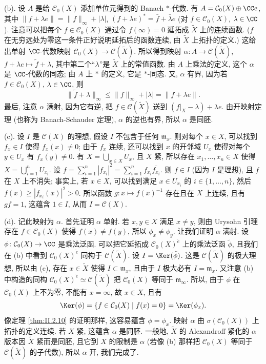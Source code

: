 \begin{exercise}[$\mathcal{C}(X)$ 的谱]
\begin{solution}
(b). 设 $A$ 是给 $\mathcal{C}_0(X)$ 添加单位元得到的 Banach $*$-代数. 有 $A = \mathcal{C}_0(X) \oplus \CC e$, 其中 $\|f + \lambda e\| = \|f\|_{\infty} + |\lambda|$, $(f + \lambda e)^* = \bar{f} + \bar{\lambda}e$ (对 $f \in \mathcal{C}_0(X)$, $\lambda \in \CC$).
注意可以把每个 $f \in \mathcal{C}_0(X)$ 通过令 $f(\infty) = 0$ 延拓成 $\tilde{X}$ 上的连续函数. ($f$ 在无穷远处为零这一条件正好说明延拓后的函数连续, 由 $\tilde{X}$ 上拓扑的定义.) 这给出单射 $\CC$-代数映射 $\mathcal{C}_0(X) \to \mathcal{C}(\tilde{X})$. 所以得到映射 $\alpha \colon A \to \mathcal{C}(\tilde{X})$, $f + \lambda e \longmapsto \tilde{f} + \lambda$, 其中第二个``$\lambda$''是 $\tilde{X}$ 上的常值函数. 由 $A$ 上乘法的定义, 这个 $\alpha$ 是 $\CC$-代数的同态; 由 $A$ 上 $*$ 的定义, 它是 $*$-同态. 又, $\alpha$ 有界, 因为若 $f \in \mathcal{C}_0(X)$, $\lambda \in \CC$, 则
\[
\|\tilde{f} + \lambda\|_{\infty} \leq \|f\|_{\infty} + |\lambda| = \|f + \lambda e\|.
\]
最后, 注意 $\alpha$ 满射, 因为它有逆, 把 $f \in \mathcal{C}(\tilde{X})$ 送到 $(f|_X - \lambda) + \lambda e$. 由开映射定理 (也称为 Banach-Schauder 定理), $\alpha$ 的逆也有界, 所以 $\alpha$ 是同胚.

(c). 设 $I$ 是 $\mathcal{C}(X)$ 的理想, 假设 $I$ 不包含于任何 $\mathfrak{m}_x$. 则对每个 $x \in X$, 可以找到 $f_x \in I$ 使得 $f_x(x) \neq 0$; 由于 $f_x$ 连续, 还可以找到 $x$ 的开邻域 $U_x$ 使得对每个 $y \in U_x$ 有 $f_x(y) \neq 0$. 有 $X = \bigcup_{x \in X}U_x$, 且 $X$ 紧, 所以存在 $x_1, \ldots, x_n \in X$ 使得 $X = \bigcup_{i=1}^n U_{x_i}$. 设 $f = \sum_{i=1}^n|f_{x_i}|^2 = \sum_{i=1}^n f_{x_i}\overline{f_{x_i}}$. 则 $f \in I$ (因为 $I$ 是理想), 且 $f$ 在 $X$ 上不消失; 事实上, 若 $x \in X$, 可以找到满足 $x \in U_{x_i}$ 的 $i \in \{1, \ldots, n\}$, 然后 $f(x) \geq |f_{x_i}(x)|^2 > 0$. 所以函数 $g \colon x \longmapsto f(x)^{-1}$ 存在且在 $X$ 上连续, 且有 $gf = 1$, 这蕴含 $1 \in I$, 从而 $I = \mathcal{C}(X)$.

(d). 记此映射为 $\alpha$. 首先证明 $\alpha$ 单射. 若 $x, y \in X$ 满足 $x \neq y$, 则由 Urysohn 引理存在 $f \in \mathcal{C}_0(X)$ 使得 $f(x) \neq f(y)$, 所以 $\phi_x \neq \phi_y$.
让我们证明 $\alpha$ 满射. 设 $\phi \colon \mathcal{C}_0(X) \to \CC$ 是乘法泛函. 可以把它延拓成 $\mathcal{C}_0(X)^{\tilde{e}}$ 上的乘法泛函 $\tilde{\phi}$, 且我们在 (b) 中看到 $\mathcal{C}_0(X)^{\tilde{e}}$ 同构于 $\mathcal{C}(\tilde{X})$. 设 $I = \Ker(\tilde{\phi})$. 这是 $\mathcal{C}(\tilde{X})$ 的极大理想, 所以由 (c), 存在 $x \in \tilde{X}$ 使得 $I \subset \mathfrak{m}_x$, 且由于 $I$ 极大必有 $I = \mathfrak{m}_x$. 又注意 (b) 中构造的同构 $\mathcal{C}_0(X)^{\tilde{e}} \simeq \mathcal{C}(\tilde{X})$ 把 $\mathcal{C}_0(X)$ 等同于 $\mathfrak{m}_{\infty}$. 所以, 由于 $\phi$ 在 $\mathcal{C}_0(X)$ 上不为零, 不能有 $x = \infty$, 故 $x \in X$, 且有
\[
\Ker(\phi) = \{f \in \mathcal{C}_0(X) \mid f(x) = 0\} = \Ker(\phi_x).
\]
像定理 \ref{thm:II.2.10} 的证明那样, 这容易蕴含 $\phi = \phi_x$.
映射 $\alpha$ 由 $\sigma(\mathcal{C}_0(X))$ 上拓扑的定义连续. 若 $X$ 紧, 这蕴含 $\alpha$ 是同胚. 一般地, $\tilde{X}$ 的 Alexandroff 紧化的 $\alpha$ 版本因 $\tilde{X}$ 紧而是同胚, 且它到 $X$ 的限制是 $\alpha$ (若像 (b) 那样把 $\mathcal{C}_0(X)$ 等同于 $\mathcal{C}(\tilde{X})$ 的子代数), 所以 $\alpha$ 开, 我们完成了.


\end{solution}
\end{exercise}
